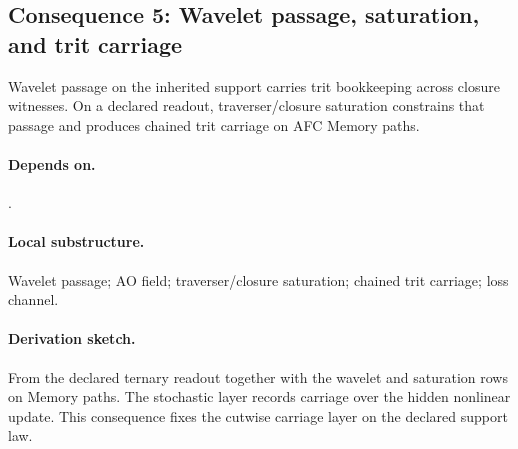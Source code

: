 \subsection{Consequence 5: Wavelet passage, saturation, and trit carriage}
\begin{consequence}\label{cons:c5}
Wavelet passage on the inherited support carries trit bookkeeping across closure witnesses. On a declared readout, traverser/closure saturation constrains that passage and produces chained trit carriage on AFC Memory paths.
\end{consequence}
\paragraph{Depends on.} .
\paragraph{Local substructure.} Wavelet passage; AO field; traverser/closure saturation; chained trit carriage; loss channel.
\paragraph{Derivation sketch.} From the declared ternary readout together with the wavelet and saturation rows on Memory paths. The stochastic layer records carriage over the hidden nonlinear update. This consequence fixes the cutwise carriage layer on the declared support law.
